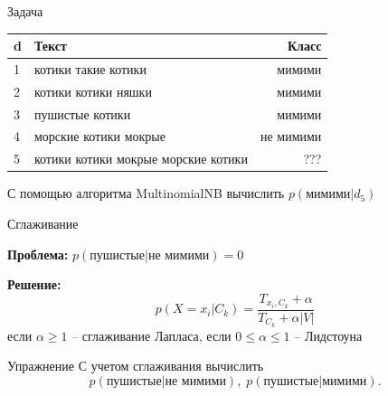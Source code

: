 \documentclass[10pt,a4paper]{beamer}
\begin{document}
\begin{frame}{Задача}

\begin{tabular}{l p{7cm} r}
d & Текст & Класс \\
\hline
1 & котики такие котики & мимими \\
2 & котики котики няшки & мимими \\
3 & пушистые котики  & мимими \\
4 & морские котики мокрые & не мимими \\
\hline
5 & котики котики мокрые морские котики & ???
\end{tabular}

\vspace{1em}
С помощью алгоритма MultinomialNB вычислить $p(\text{мимими} | d_5)$

\end{frame}


\begin{frame}{Сглаживание}

{\bf Проблема:} $p(\text{пушистые}|\text{не мимими}) = 0$

\vspace{1em}
{\bf Решение:}
\[
p(X = x_i | C_k) = \frac{T_{x_i, C_k} + \alpha}{T_{C_k} + \alpha |V|}
\]
если $\alpha \geq 1$ -- сглаживание Лапласа, если $0 \leq \alpha \leq 1$ -- Лидстоуна

\vspace{1em}
\begin{exampleblock}{Упражнение}
С учетом сглаживания вычислить 
\[
p(\text{пушистые}|\text{не мимими}), \; p(\text{пушистые}|\text{мимими}).
\]
\end{exampleblock}

\end{frame}

\end{document}
